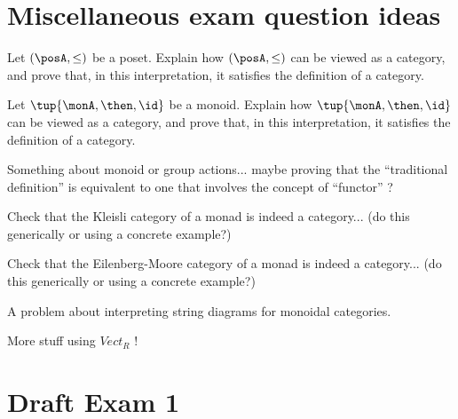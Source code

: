 \documentclass[paper=8.125in:10.250in,pagesize=pdftex,
    headinclude=false,footinclude=false,oneside,egregdoesnotlikesansseriftitles]{kaobook}
\begin{document}
\newpage

\section*{Miscellaneous exam question ideas}

\begin{exercise}
Let $(\posA, \leq)$ be a poset. Explain how $(\posA, \leq)$ can be viewed as a category, and prove that, in this interpretation, it satisfies the definition of a category. 
\end{exercise}


\begin{exercise}
Let $\tup{\monA, \then, \id}$ be a monoid. Explain how $\tup{\monA, \then, \id}$ can be viewed as a category, and prove that, in this interpretation, it satisfies the definition of a category. 
\end{exercise}


\begin{exercise}
Something about monoid or group actions... maybe proving that the ``traditional definition'' is equivalent to one that involves the concept of ``functor'' ?
\end{exercise}


\begin{exercise}
Check that the Kleisli category of a monad is indeed a category... (do this generically or using a concrete example?)
\end{exercise}

\begin{exercise}
Check that the Eilenberg-Moore category of a monad is indeed a category...  (do this generically or using a concrete example?)
\end{exercise}


\begin{exercise}
A problem about interpreting string diagrams for monoidal categories. 
\end{exercise}


\begin{exercise}
More stuff using $Vect_R$ !
\end{exercise}

\newpage

\section*{Draft Exam 1}
\end{document}
